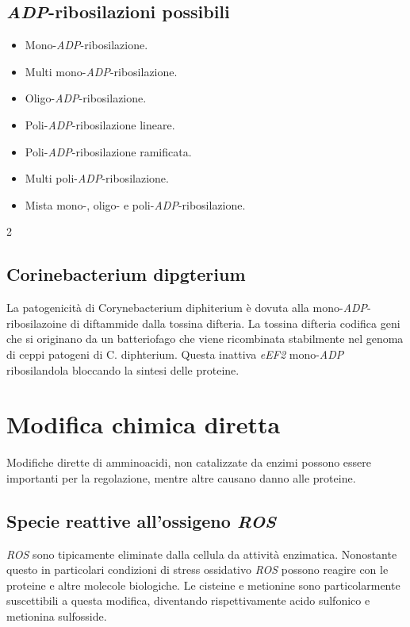 	\subsection{\emph{ADP}-ribosilazioni possibili}
	\begin{multicols}{2}
		\begin{itemize}
			\item Mono-\emph{ADP}-ribosilazione.
			\item Multi mono-\emph{ADP}-ribosilazione.
			\item Oligo-\emph{ADP}-ribosilazione.
			\item Poli-\emph{ADP}-ribosilazione lineare.
			\item Poli-\emph{ADP}-ribosilazione ramificata.
			\item Multi poli-\emph{ADP}-ribosilazione.
			\item Mista mono-, oligo- e poli-\emph{ADP}-ribosilazione.
		\end{itemize}
	\end{multicols}{2}
	
	\subsection{Corinebacterium dipgterium}
	La patogenicit\`a di Corynebacterium diphiterium \`e dovuta alla mono-\emph{ADP}-ribosilazoine di diftammide dalla tossina difteria.
	La tossina difteria codifica geni che si originano da un batteriofago che viene ricombinata stabilmente nel genoma di ceppi patogeni di C. diphterium.
	Questa inattiva \emph{eEF2} mono-\emph{ADP} ribosilandola bloccando la sintesi delle proteine.

\section{Modifica chimica diretta}
Modifiche dirette di amminoacidi, non catalizzate da enzimi possono essere importanti per la regolazione, mentre altre causano danno alle proteine.

	\subsection{Specie reattive all'ossigeno \emph{ROS}}
	\emph{ROS} sono tipicamente eliminate dalla cellula da attivit\`a enzimatica.
	Nonostante questo in particolari condizioni di stress ossidativo \emph{ROS} possono reagire con le proteine e altre molecole biologiche. 
	Le cisteine e metionine sono particolarmente suscettibili a questa modifica, diventando rispettivamente acido sulfonico e metionina sulfosside.

